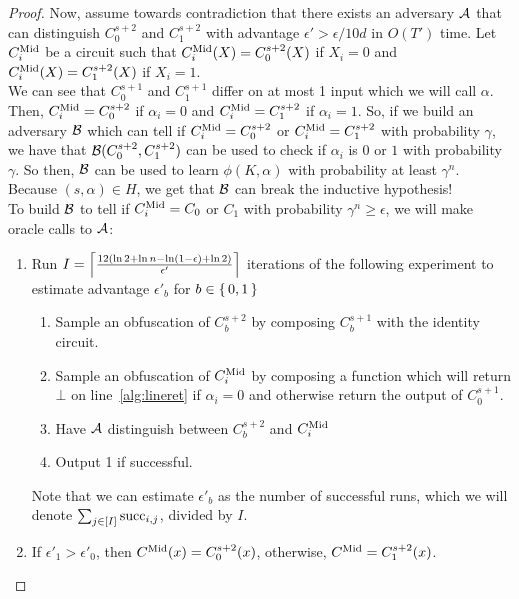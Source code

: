 \begin{lemma}
\begin{proof}
		Now, assume towards contradiction that there exists an adversary $\mathcal{A}$ that can distinguish $C_0^{s + 2}$ and $C_1^{s + 2}$ with advantage $\epsilon' > \epsilon / 10d$
		in $O(T')$ time.
		Let $C^{\text{Mid}}_i$ be a circuit such that $C^{\text{Mid}}_i(X) = C_0^{s + 2}(X)$ if $X_i = 0$ and $C^{\text{Mid}}_i(X) = C_1^{s + 2}(X)$ if $X_i = 1$.\\
		We can see that $C_0^{s + 1}$ and $C_1^{s + 1}$ differ on at most 1 input which we will call $\alpha$. %
		Then, $C^{\text{Mid}}_i = C_0^{s + 2}$ if $\alpha_i = 0$ and $C^{\text{Mid}}_i = C_1^{s + 2}$ if $\alpha_i = 1$.
		So, if we build an adversary $\mathcal{B}$ which can tell if $C^{\text{Mid}}_i = C_0^{s + 2}$ or $C^{\text{Mid}}_i = C_1^{s + 2}$ with probability $\gamma$,
		we have that $\mathcal{B}(C_0^{s + 2}, C_1^{s + 2})$ can be used to check if $\alpha_i$ is $0$ or $1$ with probability $\gamma$.
		So then, $\mathcal{B}$ can be used to learn $\phi(K, \alpha)$ with probability at least $\gamma^n$.
		Because $(s, \alpha) \in H$, we get that $\mathcal{B}$ can break the inductive hypothesis!\\
		\linebreak
		To build $\mathcal{B}$ to tell if $C^{\text{Mid}}_i = C_0$ or $C_1$ with probability $\gamma^n \geq \epsilon$, we will make oracle calls to $\mathcal{A}$:
		\begin{enumerate}
			\item Run $I =\left\lceil 
			\frac{12\left(\ln 2 + \ln n - \ln\left(1 - \epsilon\right) + \ln 2\right)}{\epsilon'} \right\rceil$ iterations of the following experiment to estimate advantage $\epsilon'_b$ for $b \in \set{0, 1}$
				\begin{enumerate}
					\item Sample an obfuscation of $C_b^{s + 2}$ by composing $C_b^{s + 1}$ with the identity circuit.
					\item Sample an obfuscation of $C^{\text{Mid}}_i$ by composing a function which will return $\bot$ on line~\ref{alg:lineret} if $\alpha_i = 0$ and otherwise return the output of $C_0^{s + 1}$.
					\item Have $\mathcal{A}$ distinguish between $C_b^{s + 2}$ and $C^{\text{Mid}}_i$
					\item Output 1 if successful.
				\end{enumerate}
			Note that we can estimate $\epsilon'_b$ as the number of successful runs, which we will denote $\sum_{j \in [I]} \text{succ}_{i, j}$, divided by $I$.
			\item If $\epsilon'_1 > \epsilon'_0$, then $C^{\text{Mid}}(x) = C_0^{s+2}(x)$, otherwise, $C^{\text{Mid}} = C_1^{s+2}(x)$.
		\end{enumerate}


\end{proof}
\end{lemma}

